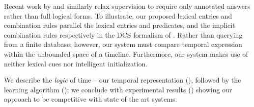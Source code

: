 Recent work by  and 
	 similarly relax supervision 
	to require only annotated answers rather than full logical forms.
To illustrate, our proposed lexical entries and combination rules parallel
	the lexical entries and predicates, and the implicit combination rules
	respectively in the DCS formalism of .
Rather than querying from a finite database; however, our system must compare
	temporal expression within the unbounded space of a timeline.
Furthermore, our system makes use of neither lexical cues nor intelligent
	initialization.


We describe the \textit{logic} of time -- our temporal representation
	(), followed by the learning algorithm
	(); we conclude with experimental results 
	() showing our
	approach to be competitive with state of the art systems.
